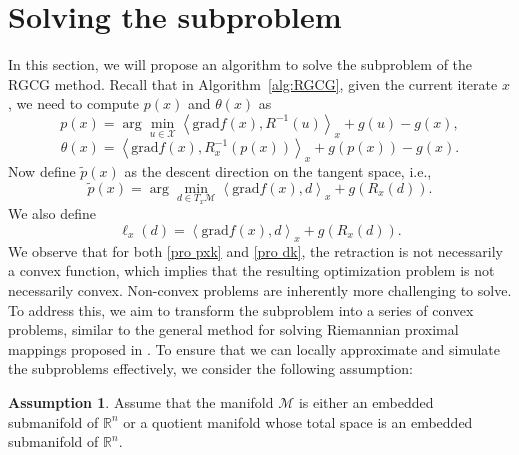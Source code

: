 \documentclass[pdflatex,sn-mathphys-num]{sn-jnl}%
\theoremstyle{definition} %
\newtheorem{assumption}{Assumption} %
\theoremstyle{remark} %
\newcommand{\grad}{\mathrm{grad}}
\begin{document}
\section{Solving the subproblem}\label{sec: subproblem}
In this section, we will propose an algorithm to solve the subproblem of the RGCG method.
Recall that in Algorithm~\ref{alg:RGCG}, given the current iterate $x$,
we need to compute $p(x)$ and $\theta(x)$ as
\begin{equation}\label{pro pxk}
    p(x) = \arg\min_{u \in \mathcal{X}}  \left\langle\grad f(x), R^{-1}(u)\right\rangle_{x}  +g(u) -g(x),
\end{equation}
\begin{equation}
    \theta(x) =  \left\langle\grad f(x), R^{-1}_{x}(p(x)) \right\rangle_{x} +g(p(x)) -g(x).
\end{equation}
Now define $\tilde{p}(x)$ as the descent direction on the tangent space, i.e.,
\begin{equation}\label{pro dk}
    \tilde{p}(x) = \arg\min_{d \in T_{x}\mathcal{M}}  \left\langle\grad f(x), d \right\rangle_{x}  +g(R_{x}(d)).
\end{equation}
We also define
\begin{equation}
    \ell_x(d) =  \left\langle\grad f(x), d \right\rangle_{x} +g(R_{x}(d)). 
\end{equation}
We observe that for both \eqref{pro pxk} and \eqref{pro dk}, the retraction is not necessarily a convex function, which implies that the resulting optimization problem is not necessarily convex.
Non-convex problems are inherently more challenging to solve. To address this, we aim to transform the subproblem into a series of convex problems, similar to the general method for solving Riemannian proximal mappings proposed in \cite{huang_riemannian_2022}. To ensure that we can locally approximate and simulate the subproblems effectively, we consider the following assumption:

\begin{assumption}\label{assump6}
 Assume that the manifold \(\mathcal{M}\) is either an embedded submanifold of \(\mathbb{R}^n\) or a quotient manifold whose total space is an embedded submanifold of \(\mathbb{R}^n\).
\end{assumption} 
\end{document}
